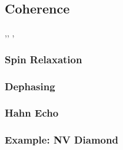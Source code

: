 \cite{Niethammer2019}


\cite{Morello2010}

\cite{PhysRevApplied.17.034046}


\subsection{Coherence}
\cite{Christle2014},\cite{Soltamov2019}, \cite{Gilardoni2020} \cite{BulanceaLindvall2021}, \cite{Astner2022}

\cite{Seo2016-ed}

\subsubsection{Spin Relaxation}
\subsubsection{Dephasing}
\subsubsection{Hahn Echo}
\cite{Wu2016}
\subsubsection{Example: NV Diamond}


